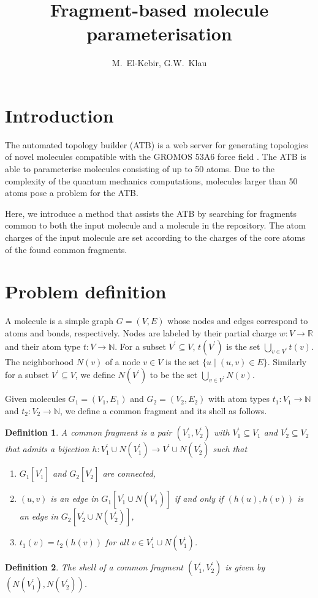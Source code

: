 \documentclass[11pt]{article}
\author{M.~El-Kebir, G.W.~Klau}
\title{Fragment-based molecule parameterisation}
\newtheorem{definition}{Definition}[section]
\begin{document}
\maketitle

\section{Introduction}

The automated topology builder (ATB) is a web server for generating topologies
of novel molecules compatible with the GROMOS 53A6 force field \cite{Malde11}.
The ATB is able to parameterise molecules consisting of up to 50 atoms. Due to
the complexity of the quantum mechanics computations, molecules larger than 50
atoms pose a problem for the ATB. 

Here, we introduce a method that assists the ATB by searching for fragments
common to both the input molecule and a molecule in the repository. The atom
charges of the input molecule are set according to the charges of the core atoms
of the found common fragments.

\section{Problem definition}

A molecule is a simple graph $G=(V,E)$ whose nodes and edges correspond to atoms
and bonds, respectively. Nodes are labeled by their partial charge $w : V
\rightarrow \mathbb{R}$ and their atom type $t : V \rightarrow \mathbb{N}$. 
For a subset $V^\prime \subseteq V$, $t(V^\prime)$ is the set $\bigcup_{v \in
V^\prime} t(v)$. The neighborhood $N(v)$ of a node $v \in V$ is the set $\{ u
\mid (u,v) \in E \}$. Similarly for a subset $V^\prime \subseteq V$, we define
$N(V^\prime)$ to be the set $\bigcup_{v \in V^\prime} N(v)$. 

Given molecules $G_1 = (V_1, E_1)$ and $G_2 = (V_2, E_2)$ with atom types $t_1 :
V_1 \rightarrow \mathbb{N}$ and $t_2 : V_2 \rightarrow \mathbb{N}$, we define a
common fragment and its shell as follows.

\begin{definition}
  A \emph{common fragment} is a pair $(V^\prime_1, V^\prime_2)$ with $V^\prime_1
  \subseteq V_1$ and $V^\prime_2 \subseteq V_2$ that admits a bijection $h :
  V^\prime_1 \cup N(V^\prime_1) \rightarrow V^\prime \cup N(V^\prime_2)$ such
  that
  \begin{enumerate}
    \item[(i)] $G_1[V^\prime_1]$ and $G_2[V^\prime_2]$ are connected,
    \item[(ii)] $(u,v)$ is an edge in $G_1[V^\prime_1 \cup N(V^\prime_1)]$ if and
      only if $(h(u),h(v))$ is an edge in $G_2[V^\prime_2 \cup N(V^\prime_2)]$,
    \item[(iii)] $t_1(v) = t_2(h(v))$ for all $v \in V^\prime_1 \cup
      N(V^\prime_1)$.
  \end{enumerate}
\end{definition}
\begin{definition}
  The \emph{shell} of a common fragment $(V^\prime_1, V^\prime_2)$ is given
  by $(N(V^\prime_1), N(V^\prime_2))$.
\end{definition}
\end{document}
